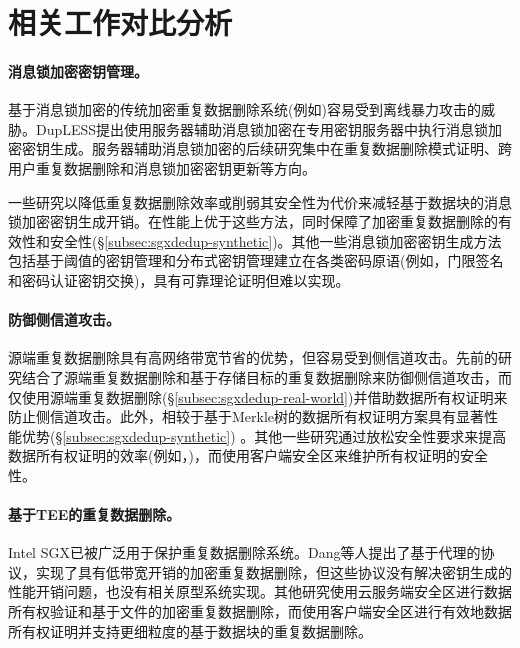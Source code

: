 \section{相关工作对比分析}
\label{sec:sgxdedup-related_work}

\paragraph*{消息锁加密密钥管理。} 基于消息锁加密的传统加密重复数据删除系统(例如)容易受到离线暴力攻击的威胁。DupLESS提出使用服务器辅助消息锁加密在专用密钥服务器中执行消息锁加密密钥生成。服务器辅助消息锁加密的后续研究集中在重复数据删除模式证明、跨用户重复数据删除和消息锁加密密钥更新等方向。

一些研究以降低重复数据删除效率或削弱其安全性为代价来减轻基于数据块的消息锁加密密钥生成开销。\sysnameS 在性能上优于这些方法，同时保障了加密重复数据删除的有效性和安全性(\S\ref{subsec:sgxdedup-synthetic})。其他一些消息锁加密密钥生成方法包括基于阈值的密钥管理和分布式密钥管理建立在各类密码原语(例如，门限签名和密码认证密钥交换)，具有可靠理论证明但难以实现。

\paragraph*{防御侧信道攻击。}源端重复数据删除具有高网络带宽节省的优势，但容易受到侧信道攻击。先前的研究结合了源端重复数据删除和基于存储目标的重复数据删除来防御侧信道攻击，而\sysnameS 仅使用源端重复数据删除(\S\ref{subsec:sgxdedup-real-world})并借助数据所有权证明来防止侧信道攻击。此外，\sysnameS 相较于基于Merkle树的数据所有权证明方案具有显著性能优势(\S\ref{subsec:sgxdedup-synthetic}) 。其他一些研究通过放松安全性要求来提高数据所有权证明的效率(例如，)，而\sysnameS 使用客户端安全区来维护所有权证明的安全性。

\paragraph*{基于TEE的重复数据删除。} Intel SGX已被广泛用于保护重复数据删除系统。Dang等人提出了基于代理的协议，实现了具有低带宽开销的加密重复数据删除，但这些协议没有解决密钥生成的性能开销问题，也没有相关原型系统实现。其他研究使用云服务端安全区进行数据所有权验证和基于文件的加密重复数据删除，而\sysnameS 使用客户端安全区进行有效地数据所有权证明并支持更细粒度的基于数据块的重复数据删除。
